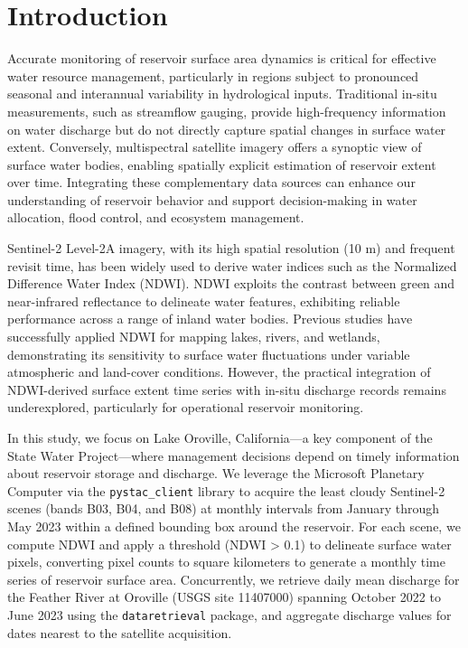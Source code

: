 \documentclass[preprint,12pt]{elsarticle}
\begin{document}
\section{Introduction}

Accurate monitoring of reservoir surface area dynamics is critical for effective water resource management, particularly in regions subject to pronounced seasonal and interannual variability in hydrological inputs. Traditional in-situ measurements, such as streamflow gauging, provide high-frequency information on water discharge but do not directly capture spatial changes in surface water extent. Conversely, multispectral satellite imagery offers a synoptic view of surface water bodies, enabling spatially explicit estimation of reservoir extent over time. Integrating these complementary data sources can enhance our understanding of reservoir behavior and support decision-making in water allocation, flood control, and ecosystem management.

Sentinel-2 Level-2A imagery, with its high spatial resolution (10 m) and frequent revisit time, has been widely used to derive water indices such as the Normalized Difference Water Index (NDWI). NDWI exploits the contrast between green and near-infrared reflectance to delineate water features, exhibiting reliable performance across a range of inland water bodies. Previous studies have successfully applied NDWI for mapping lakes, rivers, and wetlands, demonstrating its sensitivity to surface water fluctuations under variable atmospheric and land-cover conditions. However, the practical integration of NDWI-derived surface extent time series with in-situ discharge records remains underexplored, particularly for operational reservoir monitoring.

In this study, we focus on Lake Oroville, California—a key component of the State Water Project—where management decisions depend on timely information about reservoir storage and discharge. We leverage the Microsoft Planetary Computer via the \texttt{pystac\_client} library to acquire the least cloudy Sentinel-2 scenes (bands B03, B04, and B08) at monthly intervals from January through May 2023 within a defined bounding box around the reservoir. For each scene, we compute NDWI and apply a threshold (NDWI > 0.1) to delineate surface water pixels, converting pixel counts to square kilometers to generate a monthly time series of reservoir surface area. Concurrently, we retrieve daily mean discharge for the Feather River at Oroville (USGS site 11407000) spanning October 2022 to June 2023 using the \texttt{dataretrieval} package, and aggregate discharge values for dates nearest to the satellite acquisition.
\end{document}
